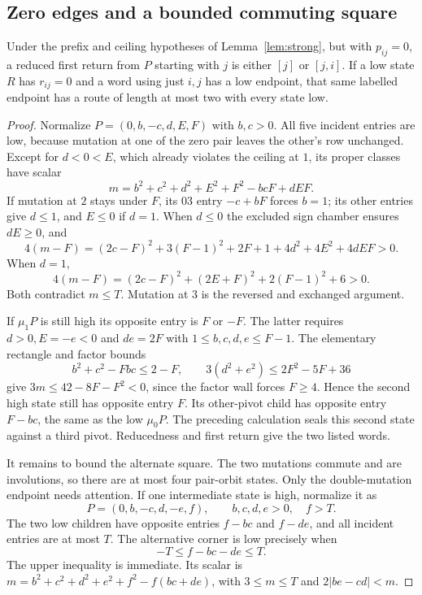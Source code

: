 \subsection{Zero edges and a bounded commuting square}
\begin{lemma}\label{lem:zero}
Under the prefix and ceiling hypotheses of Lemma~\ref{lem:strong}, but with $p_{ij}=0$, a reduced first return from $P$ starting with $j$ is either $[j]$ or $[j,i]$. If a low state $R$ has $r_{ij}=0$ and a word using just $i,j$ has a low endpoint, that same labelled endpoint has a route of length at most two with every state low.
\end{lemma}
\begin{proof}
Normalize $P=(0,b,-c,d,E,F)$ with $b,c>0$. All five incident entries are low, because mutation at one of the zero pair leaves the other's row unchanged. Except for $d<0<E$, which already violates the ceiling at $1$, its proper classes have scalar
\[
 m=b^2+c^2+d^2+E^2+F^2-bcF+dEF.
\]
If mutation at $2$ stays under $F$, its $03$ entry $-c+bF$ forces $b=1$; its other entries give $d\le1$, and $E\le0$ if $d=1$. When $d\le0$ the excluded sign chamber ensures $dE\ge0$, and
\[
 4(m-F)=(2c-F)^2+3(F-1)^2+2F+1+4d^2+4E^2+4dEF>0.
\]
When $d=1$,
\[
 4(m-F)=(2c-F)^2+(2E+F)^2+2(F-1)^2+6>0.
\]
Both contradict $m\le T$. Mutation at $3$ is the reversed and exchanged argument.

If $\mu_1P$ is still high its opposite entry is $F$ or $-F$. The latter requires $d>0,E=-e<0$ and $de=2F$ with $1\le b,c,d,e\le F-1$. The elementary rectangle and factor bounds
\[
 b^2+c^2-Fbc\le2-F,\qquad
 3(d^2+e^2)\le2F^2-5F+36
\]
give $3m\le42-8F-F^2<0$, since the factor wall forces $F\ge4$. Hence the second high state still has opposite entry $F$. Its other-pivot child has opposite entry $F-bc$, the same as the low $\mu_0P$. The preceding calculation seals this second state against a third pivot. Reducedness and first return give the two listed words.

It remains to bound the alternate square. The two mutations commute and are involutions, so there are at most four pair-orbit states. Only the double-mutation endpoint needs attention. If one intermediate state is high, normalize it as
\[
 P=(0,b,-c,d,-e,f),\qquad b,c,d,e>0,\quad f>T.
\]
The two low children have opposite entries $f-bc$ and $f-de$, and all incident entries are at most $T$. The alternative corner is low precisely when
\begin{equation}\label{eq:zerosquare}
 -T\le f-bc-de\le T.
\end{equation}
The upper inequality is immediate. Its scalar is
$m=b^2+c^2+d^2+e^2+f^2-f(bc+de)$, with $3\le m\le T$ and $2|be-cd|<m$.


\end{proof}
